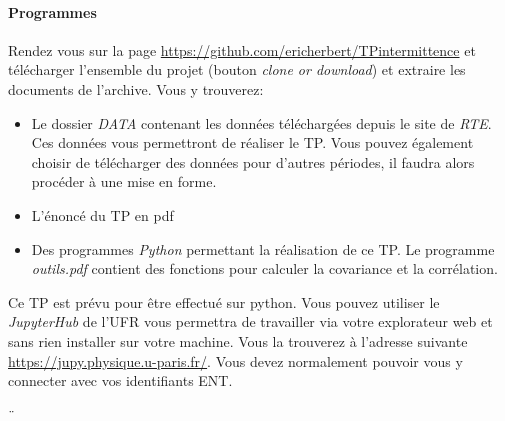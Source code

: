 \documentclass[12pt,french]{article}
\newcommand{\tmtextit}[1]{{\itshape{#1}}}
\begin{document}
\paragraph{Programmes}
Rendez vous sur la page \href{https://github.com/ericherbert/TPintermittence}{https://github.com/ericherbert/TPintermittence} et télécharger l'ensemble du projet (bouton \tmtextit{clone or download}) et extraire les
documents de l'archive. Vous y trouverez:
\begin{itemize}
  \item Le dossier \tmtextit{DATA} contenant les données téléchargées depuis le site de \tmtextit{RTE}. Ces données vous permettront de réaliser le TP. Vous pouvez également choisir de télécharger des données pour d'autres périodes, il faudra alors procéder à une mise en forme.
  
  \item L'énoncé du TP en pdf
  
  \item Des programmes \tmtextit{Python} permettant la réalisation de ce TP. Le programme \textit{outils.pdf} contient des fonctions pour calculer la covariance et la corrélation.
\end{itemize}
Ce TP est prévu pour être effectué sur python. Vous pouvez utiliser le \tmtextit{JupyterHub} de l'UFR vous permettra de travailler via votre explorateur web et sans rien installer sur votre machine. Vous la trouverez à l'adresse suivante
\href{https://jupy.physique.u-paris.fr/}{https://jupy.physique.u-paris.fr/}. Vous devez normalement pouvoir vous y connecter avec vos identifiants ENT.



¨
%  
%  
%  
%  
\end{document}
